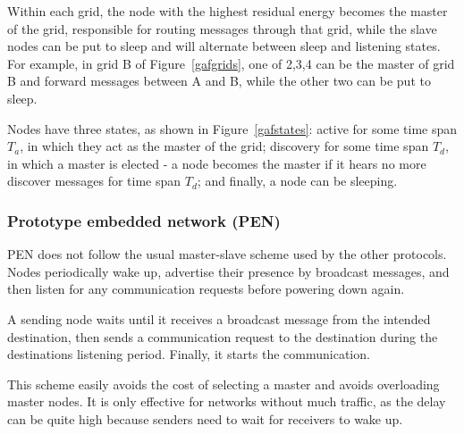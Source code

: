 Within each grid, the node with the highest residual energy becomes the master
of the grid, responsible for routing messages through that grid, while the
slave nodes can be put to sleep and will alternate between sleep and listening
states. For example, in grid B of Figure~\ref{gafgrids}, one of 2,3,4 can be the
master of grid B and forward messages between A and B, while the other two can
be put to sleep.

Nodes have three states, as shown in Figure~\ref{gafstates}: active for some time span $T_{a}$, in which they
act as the master of the grid; discovery for some time span $T_{d}$, in which a
master is elected - a node becomes the master if it hears no more discover messages
for time span $T_{d}$; and finally, a node can be sleeping.


\subsubsection{Prototype embedded network (PEN)}\label{pen}
PEN\cite{girling2000design} does not follow the usual master-slave scheme
used by the other protocols. Nodes periodically wake up, advertise their
presence
by broadcast messages, and then listen for any communication requests before
powering down again.

A sending node waits until it receives a broadcast message from the intended
destination, then sends a communication request to the destination during
the destinations listening period. Finally, it starts the communication.

This scheme easily avoids the cost of selecting a master and avoids overloading
master nodes. It is only effective for networks without much traffic, as the delay
can be quite high because senders need to wait for receivers to wake up.
